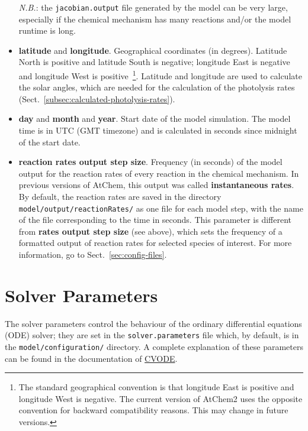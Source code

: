 \begin{itemize}
  \emph{N.B.}: the \texttt{jacobian.output} file generated by the
  model can be very large, especially if the chemical mechanism has
  many reactions and/or the model runtime is long.
\item \textbf{latitude} and \textbf{longitude}. Geographical
  coordinates (in degrees). Latitude North is positive and latitude
  South is negative; longitude East is negative and longitude West is
  positive~\footnote{The standard geographical convention is that
    longitude East is positive and longitude West is negative. The
    current version of AtChem2 uses the opposite convention for
    backward compatibility reasons. This may change in future
    versions.}. Latitude and longitude are used to calculate the solar
  angles, which are needed for the calculation of the photolysis rates
  (Sect.~\ref{subsec:calculated-photolysis-rates}).
\item \textbf{day} and \textbf{month} and \textbf{year}. Start date of
  the model simulation. The model time is in UTC (GMT timezone) and is
  calculated in seconds since midnight of the start date.
\item \textbf{reaction rates output step size}. Frequency (in seconds)
  of the model output for the reaction rates of every reaction in the
  chemical mechanism. In previous versions of AtChem, this output was
  called \textbf{instantaneous rates}. By default, the reaction rates
  are saved in the directory \texttt{model/output/reactionRates/} as
  one file for each model step, with the name of the file
  corresponding to the time in seconds. This parameter is different
  from \textbf{rates output step size} (see above), which sets the
  frequency of a formatted output of reaction rates for selected
  species of interest. For more information, go to Sect.~\ref{sec:config-files}.
\end{itemize}

\section{Solver Parameters} \label{sec:solver-parameters}

The solver parameters control the behaviour of the ordinary
differential equations (ODE) solver; they are set in the
\texttt{solver.parameters} file which, by default, is in the
\texttt{model/configuration/} directory. A complete explanation of
these parameters can be found in the documentation of
\href{https://computation.llnl.gov/projects/sundials/sundials-software}{CVODE}.

